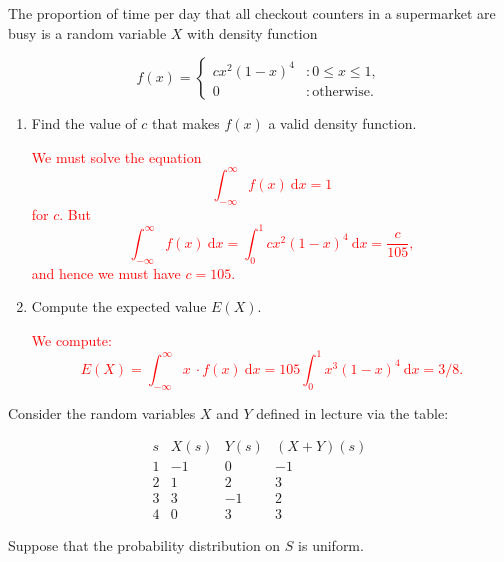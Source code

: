 \documentclass[12pt,reqno]{amsart}
\begin{document}
\bigskip
\prob The proportion of time per day that all checkout counters in a supermarket are busy is a random variable $X$ with density function

	\[
	f(x) = \begin{cases}
	cx^2(1-x)^4 & : 0 \leq x \leq 1, \\
	0 & : \text{otherwise}.
	\end{cases}
	\]

\medskip
\begin{enumerate}
\item Find the value of $c$ that makes $f(x)$ a valid density function.
    
\bigskip
\textcolor{red}{We must solve the equation
    	\[
	\int_{-\infty}^\infty f(x) \ \text{d} x  = 1
	\]
for $c$. But
    	\[
	\int_{-\infty}^\infty f(x) \ \text{d} x = \int_0^1 cx^2(1-x)^4 \ \text{d} x = \frac{c}{105},
	\]
and hence we must have $c=105$.}
\bigskip

\item Compute the expected value $E(X)$.
    
\bigskip
\textcolor{red}{We compute:
    	\[
	E(X) = \int_{-\infty}^\infty x \ \cdot f(x) \ \text{d} x = 105 \int_0^1 x^3(1-x)^4 \ \text{d} x = 3/8.
	\]}
\end{enumerate}















\bigskip
\prob Consider the random variables $X$ and $Y$ defined in lecture via the table:

	\[
	\begin{array}{c|ccc}
	s & X(s) & Y(s) & (X+Y)(s) \\ \hline
	1 & -1 & 0 & -1 \\
	2 & 1 & 2 & 3 \\
	3 & 3 & -1 & 2 \\
	4 & 0 & 3 & 3
	\end{array}
	\]

Suppose that the probability distribution on $S$ is uniform.
\end{document}
